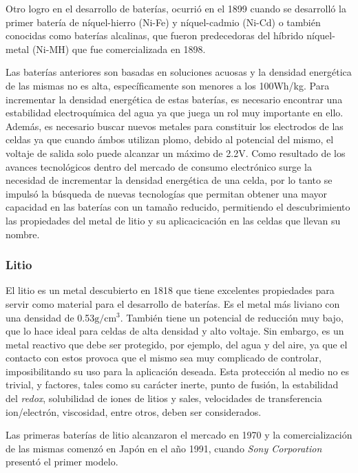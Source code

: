 \documentclass[10pt,a4paper]{article}
\begin{document}
\noindent Otro logro en el desarrollo de baterías, ocurrió en el 1899 cuando se
desarrolló la primer batería de n\'iquel-hierro (Ni-Fe) y n\'iquel-cadmio
(Ni-Cd) o también conocidas como baterías alcalinas, que fueron predecedoras del
híbrido n\'iquel-metal (Ni-MH) que fue comercializada en 1898.

\noindent Las baterías anteriores son basadas en soluciones acuosas y la
densidad energética de las mismas no es alta, espec\'ificamente son menores a
los 100Wh/kg. Para incrementar la densidad energética de estas baterías, es
necesario encontrar una estabilidad electroquímica del agua ya que juega un rol
muy importante en ello. Además, es necesario buscar nuevos metales para
constituir los electrodos de las celdas ya que cuando \'ambos utilizan plomo,
debido al potencial del mismo, el voltaje de salida solo puede alcanzar un
máximo de 2.2V. Como resultado de los avances tecnol\'ogicos dentro del mercado
de consumo electr\'onico surge la necesidad de incrementar la densidad
energética de una celda, por lo tanto se impuls\'o la b\'usqueda de nuevas
tecnolog\'ias que permitan obtener una mayor capacidad en las bater\'ias con un
tamaño reducido, permitiendo el descubrimiento las propiedades del metal de
litio y su aplicacicación en las celdas que llevan su nombre.

\subsubsection{Litio}

El litio es un metal descubierto en 1818 que tiene excelentes propiedades para
servir como material para el desarrollo de baterías. Es el metal m\'as liviano
con una densidad de 0.53$\mathrm{g/cm^3}$. Tambi\'en tiene un potencial de
reducci\'on muy bajo, que lo hace ideal para celdas de alta densidad y alto
voltaje. Sin embargo, es un metal reactivo que debe ser protegido, por ejemplo,
del agua y del aire, ya que el contacto con estos provoca que el mismo sea muy
complicado de controlar, imposibilitando su uso para la aplicación deseada. Esta
protección al medio no es trivial, y factores, tales como su carácter inerte,
punto de fusión, la estabilidad del \emph{redox}, solubilidad de iones de litios
y sales, velocidades de transferencia ion/electrón, viscosidad, entre otros,
deben ser considerados.

\noindent Las primeras baterías de litio alcanzaron el mercado en 1970 y la
comercialización de las mismas comenzó en Japón en el año 1991, cuando
\emph{Sony Corporation} presentó el primer modelo.
\end{document}
